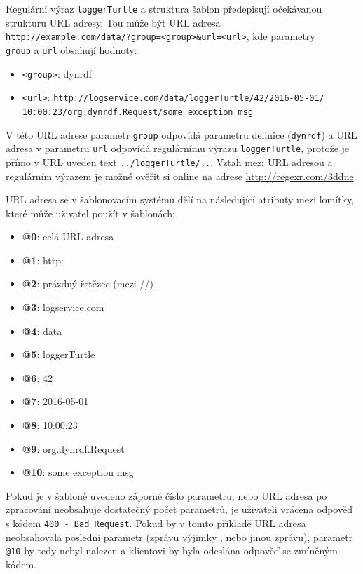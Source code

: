 \documentclass[thesis=B,czech]{FITthesis}[2012/06/26]
\begin{document}
    Regulární výraz \texttt{loggerTurtle} a struktura šablon předepisují očekávanou strukturu URL adresy. Tou může být URL adresa  \\
    \texttt{http://example.com/data/?group=<group>\&url=<url>}, kde parametry \\ \texttt{group} a \texttt{url} obsahují hodnoty:
    \begin{itemize}
     \item \texttt{<group>}: dynrdf
     \item \texttt{<url>}: \texttt{http://logservice.com/data/loggerTurtle/42/2016-05-01/\\10:00:23/org.dynrdf.Request/some exception msg}
    \end{itemize}

    V této URL adrese parametr \texttt{group} odpovídá parametru definice (\texttt{dynrdf}) a URL adresa v parametru \texttt{url} odpovídá regulárnímu výrazu
    \texttt{loggerTurtle}, protože je přímo v URL uveden text \texttt{../loggerTurtle/..}. Vztah mezi URL adresou a regulárním výrazem je možné
    ověřit si online na adrese \url{http://regexr.com/3ddne}.
    
    URL adresa se v šablonovacím systému dělí na následující atributy mezi lomítky, které může uživatel použít v šablonách:
    \begin{itemize}
     \item \textbf{@0}: celá URL adresa
     \item \textbf{@1}: http:
     \item \textbf{@2}: prázdný řetězec (mezi //)
     \item \textbf{@3}: logservice.com
     \item \textbf{@4}: data
     \item \textbf{@5}: loggerTurtle
     \item \textbf{@6}: 42
     \item \textbf{@7}: 2016-05-01
     \item \textbf{@8}: 10:00:23
     \item \textbf{@9}: org.dynrdf.Request
     \item \textbf{@10}: some exception msg
    \end{itemize}
    Pokud je v šabloně uvedeno záporné číslo parametru, nebo URL adresa po zpracování neobsahuje dostatečný počet parametrů, je uživateli vrácena
    odpověď s kódem \texttt{400 - Bad Request}. Pokud by v tomto příkladě URL adresa neobsahovala poslední parametr (zprávu výjimky , nebo jinou zprávu),
    parametr \texttt{@10} by tedy nebyl nalezen a klientovi by byla odeslána odpověď se zmíněným kódem.
\end{document}
